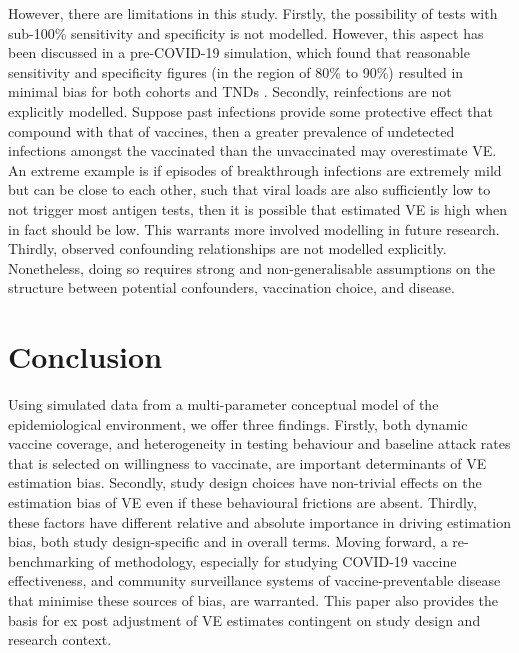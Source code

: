 \documentclass[12pt]{article}
\begin{document}
However, there are limitations in this study. Firstly, the possibility of tests with sub-100\% sensitivity and specificity is not modelled. However, this aspect has been discussed in a pre-COVID-19 simulation, which found that reasonable sensitivity and specificity figures (in the region of 80\% to 90\%) resulted in minimal bias for both cohorts and TNDs \citep{jackson2015effects}. Secondly, reinfections are not explicitly modelled. Suppose past infections provide some protective effect that compound with that of vaccines, then a greater prevalence of undetected infections amongst the vaccinated than the unvaccinated may overestimate VE. An extreme example is if episodes of breakthrough infections are extremely mild but can be close to each other, such that viral loads are also sufficiently low to not trigger most antigen tests, then it is possible that estimated VE is high when in fact should be low. This warrants more involved modelling in future research. Thirdly, observed confounding relationships are not modelled explicitly. Nonetheless, doing so requires strong and non-generalisable assumptions on the structure between potential confounders, vaccination choice, and disease.

\section{Conclusion}

Using simulated data from a multi-parameter conceptual model of the epidemiological environment, we offer three findings. Firstly, both dynamic vaccine coverage, and heterogeneity in testing behaviour and baseline attack rates that is selected on willingness to vaccinate, are important determinants of VE estimation bias. Secondly, study design choices have non-trivial effects on the estimation bias of VE even if these behavioural frictions are absent.  Thirdly, these factors have different relative and absolute importance in driving estimation bias, both study design-specific and in overall terms. Moving forward, a re-benchmarking of methodology, especially for studying COVID-19 vaccine effectiveness, and community surveillance systems of vaccine-preventable disease that minimise these sources of bias, are warranted. This paper also provides the basis for ex post adjustment of VE estimates contingent on study design and research context.

\newpage



\newpage
\appendix
{}
\end{document}
